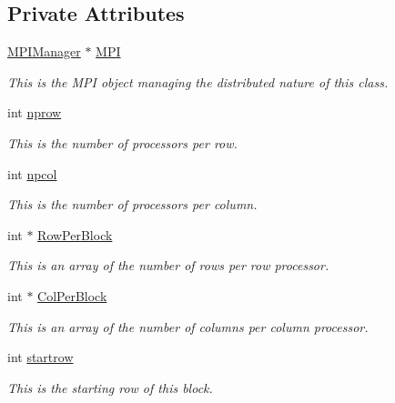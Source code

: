 \subsection*{Private Attributes}
\begin{DoxyCompactItemize}
\item 
\hyperlink{classJKBuilder_1_1MPIManager}{MPIManager} $\ast$ \hyperlink{classJKBuilder_1_1DistributedMatrix_a3753afd7c89e077643a274ed7c4e9129}{MPI}
\begin{DoxyCompactList}\small\item\em This is the MPI object managing the distributed nature of this class. \item\end{DoxyCompactList}\item 
int \hyperlink{classJKBuilder_1_1DistributedMatrix_a3580dd419b5547085d094696e5dcc7b7}{nprow}
\begin{DoxyCompactList}\small\item\em This is the number of processors per row. \item\end{DoxyCompactList}\item 
int \hyperlink{classJKBuilder_1_1DistributedMatrix_a9d55bf8e4bef97aaacf79db88a9863cc}{npcol}
\begin{DoxyCompactList}\small\item\em This is the number of processors per column. \item\end{DoxyCompactList}\item 
int $\ast$ \hyperlink{classJKBuilder_1_1DistributedMatrix_a417b5c8d480cf1688e6c403fd29fac12}{RowPerBlock}
\begin{DoxyCompactList}\small\item\em This is an array of the number of rows per row processor. \item\end{DoxyCompactList}\item 
int $\ast$ \hyperlink{classJKBuilder_1_1DistributedMatrix_a19f481b08a628ad2707b1e82bbb88e1d}{ColPerBlock}
\begin{DoxyCompactList}\small\item\em This is an array of the number of columns per column processor. \item\end{DoxyCompactList}\item 
int \hyperlink{classJKBuilder_1_1DistributedMatrix_a0870e21b7fb2685df81b50e80b22ed7b}{startrow}
\begin{DoxyCompactList}\small\item\em This is the starting row of this block. \item\end{DoxyCompactList}\item 

\end{DoxyCompactItemize}
